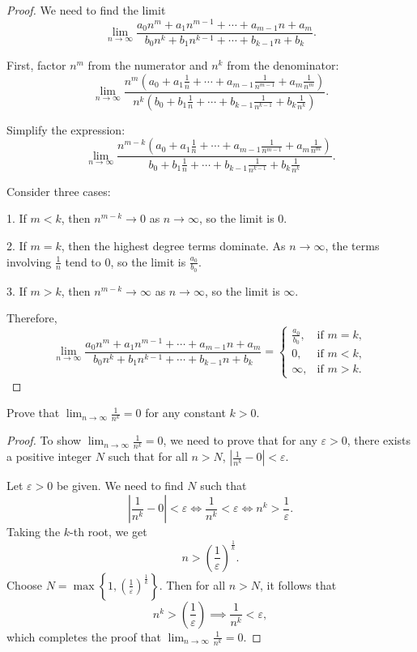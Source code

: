 \begin{proof}
We need to find the limit
\[
\lim_{n \to \infty} \frac{a_0 n^m + a_1 n^{m-1} + \cdots + a_{m-1} n + a_m}{b_0 n^k + b_1 n^{k-1} + \cdots + b_{k-1} n + b_k}.
\]

First, factor \(n^m\) from the numerator and \(n^k\) from the denominator:
\[
\lim_{n \to \infty} \frac{n^m \left(a_0 + a_1 \frac{1}{n} + \cdots + a_{m-1} \frac{1}{n^{m-1}} + a_m \frac{1}{n^m}\right)}{n^k \left(b_0 + b_1 \frac{1}{n} + \cdots + b_{k-1} \frac{1}{n^{k-1}} + b_k \frac{1}{n^k}\right)}.
\]

Simplify the expression:
\[
\lim_{n \to \infty} \frac{n^{m-k} \left(a_0 + a_1 \frac{1}{n} + \cdots + a_{m-1} \frac{1}{n^{m-1}} + a_m \frac{1}{n^m}\right)}{b_0 + b_1 \frac{1}{n} + \cdots + b_{k-1} \frac{1}{n^{k-1}} + b_k \frac{1}{n^k}}.
\]

Consider three cases:

1. If \(m < k\), then \(n^{m-k} \to 0\) as \(n \to \infty\), so the limit is \(0\).

2. If \(m = k\), then the highest degree terms dominate. As \(n \to \infty\), the terms involving \(\frac{1}{n}\) tend to \(0\), so the limit is \(\frac{a_0}{b_0}\).

3. If \(m > k\), then \(n^{m-k} \to \infty\) as \(n \to \infty\), so the limit is \(\infty\).

Therefore,
\[
\lim_{n \to \infty} \frac{a_0 n^m + a_1 n^{m-1} + \cdots + a_{m-1} n + a_m}{b_0 n^k + b_1 n^{k-1} + \cdots + b_{k-1} n + b_k} = 
\begin{cases} 
\frac{a_0}{b_0}, & \text{if } m = k, \\
0, & \text{if } m < k, \\
\infty, & \text{if } m > k.
\end{cases}
\]
\end{proof}
%
\begin{exercise}
Prove that $\lim_{n \to \infty} \frac{1}{n^k} = 0$ for any constant $k > 0$.
\end{exercise}
\begin{proof}
To show $\lim_{n \to \infty} \frac{1}{n^k} = 0$, we need to prove that for any $\varepsilon > 0$, there exists a positive integer $N$ such that for all $n > N$, $\left|\frac{1}{n^k} - 0\right| < \varepsilon$.

Let $\varepsilon > 0$ be given. We need to find $N$ such that
\[
\left|\frac{1}{n^k} - 0\right| < \varepsilon \iff \frac{1}{n^k} < \varepsilon \iff n^k > \frac{1}{\varepsilon}.
\]
Taking the $k$-th root, we get
\[
n > \left(\frac{1}{\varepsilon}\right)^{\frac{1}{k}}.
\]
Choose $N = \max\left\{1, \left(\frac{1}{\varepsilon}\right)^{\frac{1}{k}}  \right\}$. Then for all $n > N$, it follows that
\[
n^k > \left(\frac{1}{\varepsilon}\right) \implies \frac{1}{n^k} < \varepsilon,
\]
which completes the proof that $\lim_{n \to \infty} \frac{1}{n^k} = 0$.
\end{proof}
